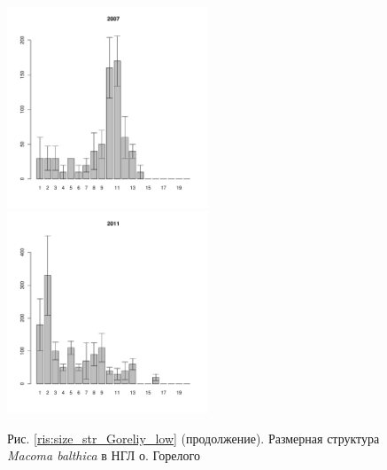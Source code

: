 \begin{figure}[h]

\begin{multicols}{3}
\hfill
\includegraphics[width=60mm]{../White_Sea/Luvenga_Goreliy/low_2007_.pdf}
\hfill
\includegraphics[width=60mm]{../White_Sea/Luvenga_Goreliy/low_2011_.pdf}
\end{multicols}


\begin{center}
Рис. \ref{ris:size_str_Goreliy_low} (продолжение). Размерная структура {\it Macoma balthica} в НГЛ
 о. Горелого

\end{center}
\end{figure}



